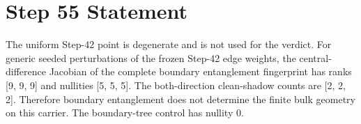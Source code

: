 \documentclass[11pt]{article}
\begin{document}
\section*{Step 55 Statement}
The uniform Step-42 point is degenerate and is not used for the verdict. For generic seeded perturbations of the frozen Step-42 edge weights, the central-difference Jacobian of the complete boundary entanglement fingerprint has ranks [9, 9, 9] and nullities [5, 5, 5]. The both-direction clean-shadow counts are [2, 2, 2]. Therefore boundary entanglement does not determine the finite bulk geometry on this carrier. The boundary-tree control has nullity 0.
\end{document}
